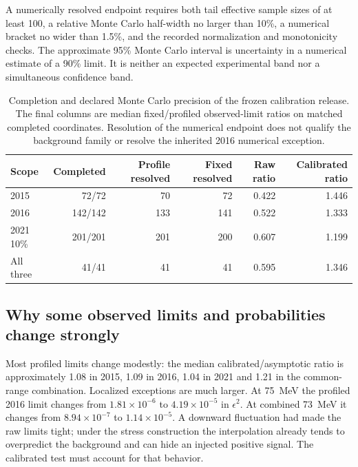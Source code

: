 A numerically resolved endpoint requires both tail effective sample
sizes of at least 100, a relative Monte Carlo half-width no larger than 10\%,
a numerical bracket no wider than 1.5\%, and the recorded normalization
and monotonicity checks. The approximate 95\% Monte Carlo interval is
uncertainty in a numerical estimate of a 90\% limit. It is neither an
expected experimental band nor a simultaneous confidence band.

\begin{table}[htbp]\centering\small
\begin{tabular}{lrrrrr}\toprule
Scope & Completed & Profile resolved & Fixed resolved & Raw ratio & Calibrated ratio\\\midrule
2015 & 72/72 & 70 & 72 & 0.422 & 1.446\\
2016 & 142/142 & 133 & 141 & 0.522 & 1.333\\
2021 10\% & 201/201 & 201 & 200 & 0.607 & 1.199\\
All three & 41/41 & 41 & 41 & 0.595 & 1.346\\\bottomrule
\end{tabular}
\caption{Completion and declared Monte Carlo precision of the frozen
calibration release. The final columns are median fixed/profiled
observed-limit ratios on matched completed coordinates. Resolution of
the numerical endpoint does not qualify the background family or resolve
the inherited 2016 numerical exception.}
\label{v5-tab:calibration-summary}
\end{table}

\subsection{Why some observed limits and probabilities change strongly}
Most profiled limits change modestly: the median calibrated/asymptotic
ratio is approximately 1.08 in 2015, 1.09 in 2016, 1.04 in 2021 and 1.21
in the common-range combination. Localized exceptions are much larger.
At 75~MeV the profiled 2016 limit changes from $1.81\times10^{-6}$ to
$4.19\times10^{-5}$ in $\epsilon^2$. At combined 73~MeV it changes from
$8.94\times10^{-7}$ to $1.14\times10^{-5}$. A downward fluctuation had
made the raw limits tight; under the stress construction the interpolation
already tends to overpredict the background and can hide an injected
positive signal. The calibrated test must account for that behavior.

